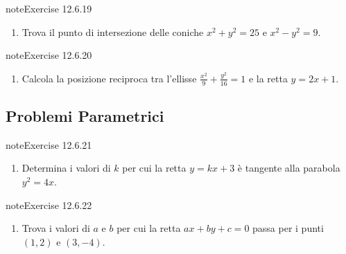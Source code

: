 \documentclass[letterpaper,10pt,italian]{jupyterBook}
\begin{document}
\begin{sphinxadmonition}{note}{Exercise 12.6.19}


\begin{enumerate}
%
\setcounter{enumi}{18}
\item {} 
\sphinxAtStartPar
Trova il punto di intersezione delle coniche \( x^2 + y^2 = 25 \) e \( x^2 - y^2 = 9 \).

\end{enumerate}
\end{sphinxadmonition}
 \label{exercise:ch/analytic_geometry/analytic_geometry_2d/problems-exercise-19}

\begin{sphinxadmonition}{note}{Exercise 12.6.20}


\begin{enumerate}
%
\setcounter{enumi}{19}
\item {} 
\sphinxAtStartPar
Calcola la posizione reciproca tra l’ellisse \( \frac{x^2}{9} + \frac{y^2}{16} = 1 \) e la retta \( y = 2x + 1 \).

\end{enumerate}
\end{sphinxadmonition}


\subsection{Problemi Parametrici}
\label{\detokenize{ch/analytic_geometry/analytic_geometry_2d/problems:problemi-parametrici}} \label{exercise:ch/analytic_geometry/analytic_geometry_2d/problems-exercise-20}

\begin{sphinxadmonition}{note}{Exercise 12.6.21}


\begin{enumerate}
%
\setcounter{enumi}{20}
\item {} 
\sphinxAtStartPar
Determina i valori di \( k \) per cui la retta \( y = kx + 3 \) è tangente alla parabola \( y^2 = 4x \).

\end{enumerate}
\end{sphinxadmonition}
 \label{exercise:ch/analytic_geometry/analytic_geometry_2d/problems-exercise-21}

\begin{sphinxadmonition}{note}{Exercise 12.6.22}


\begin{enumerate}
%
\setcounter{enumi}{21}
\item {} 
\sphinxAtStartPar
Trova i valori di \( a \) e \( b \) per cui la retta \( ax + by + c = 0 \) passa per i punti \( (1, 2) \) e \( (3, -4) \).

\end{enumerate}
\end{sphinxadmonition}
 \label{exercise:ch/analytic_geometry/analytic_geometry_2d/problems-exercise-22}
\end{document}
